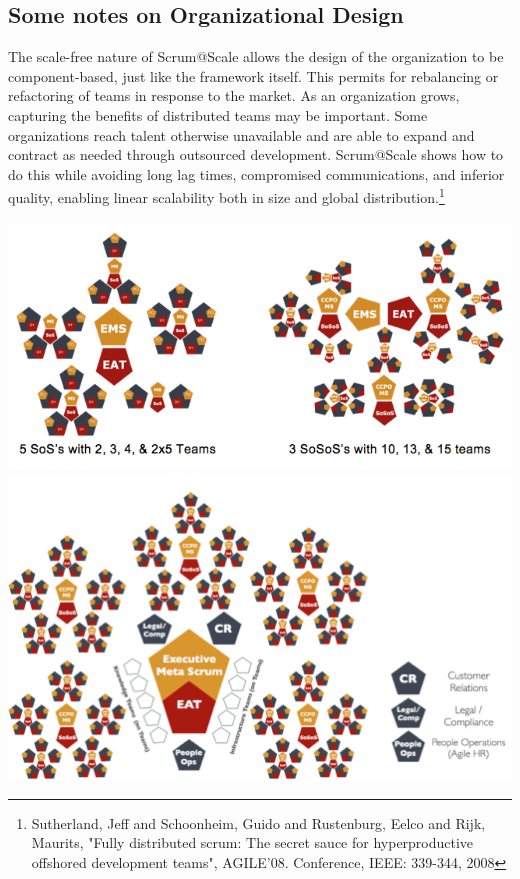 \documentclass[12pt,a4paper,parskip=full]{scrartcl}
\begin{document}
\subsection{Some notes on Organizational Design}
The scale-free nature of Scrum@Scale allows the design of the organization
to be component-based, just like the framework itself. This permits for
rebalancing or refactoring of teams in response to the market. As an
organization grows, capturing the benefits of distributed teams may be
important. Some organizations reach talent otherwise unavailable and are
able to expand and contract as needed through outsourced development.
Scrum@Scale shows how to do this while avoiding long lag times, compromised
communications, and inferior quality, enabling linear scalability both in
size and global distribution.\footnote{Sutherland, Jeff and Schoonheim,
Guido and Rustenburg, Eelco and Rijk, Maurits, "Fully distributed scrum:
The secret sauce for hyperproductive offshored development teams",
AGILE'08. Conference, IEEE: 339-344, 2008}

\includegraphics[width=1.0\linewidth]{VariableSoS-R2.png}
\includegraphics[width=1.0\linewidth]{OrganizationalDiagram.png}
\end{document}

